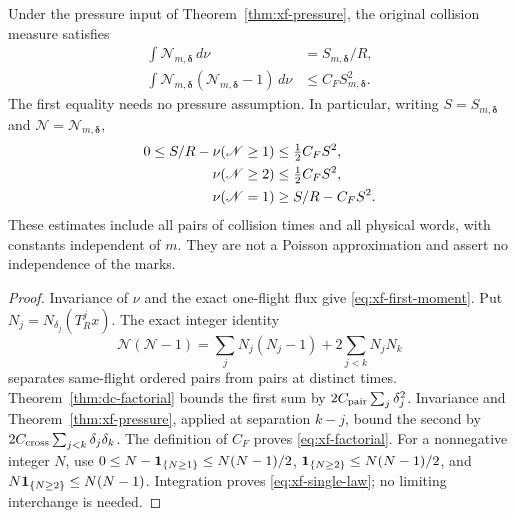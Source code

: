 \begin{theorem}
\label{thm:xf-full-count}
Under the pressure input of Theorem~\ref{thm:xf-pressure}, the
original collision measure satisfies
\begin{align}
 \int\mathscr N_{m,\boldsymbol\delta}\,d\nu
           &=S_{m,\boldsymbol\delta}/R,\label{eq:xf-first-moment}\\
 \int\mathscr N_{m,\boldsymbol\delta}
       (\mathscr N_{m,\boldsymbol\delta}-1)\,d\nu
           &\le C_F S_{m,\boldsymbol\delta}^2.\label{eq:xf-factorial}
\end{align}
The first equality needs no pressure assumption. In particular,
writing $S=S_{m,\boldsymbol\delta}$ and $\mathscr N=\mathscr N_{m,\boldsymbol\delta}$,
\begin{align}
 0\le S/R-\nu(\mathscr N\ge1)&\le\tfrac12C_FS^2,\notag\\
 \nu(\mathscr N\ge2)&\le\tfrac12C_FS^2,\notag\\
 \nu(\mathscr N=1)&\ge S/R-C_FS^2.\label{eq:xf-single-law}
\end{align}
These estimates include all pairs of collision times and all physical
words, with constants independent of $m$. They are not a Poisson
approximation and assert no independence of the marks.
\end{theorem}
\begin{proof}
Invariance of $\nu$ and the exact one-flight flux give
\eqref{eq:xf-first-moment}. Put $N_j=N_{\delta_j}(T_R^jx)$.
The exact integer identity
\[
 \mathscr N(\mathscr N-1)
      =\sum_jN_j(N_j-1)+2\sum_{j<k}N_jN_k
\]
separates same-flight ordered pairs from pairs at distinct times.
Theorem~\ref{thm:dc-factorial} bounds the first sum by
$2C_{\rm pair}\sum_j\delta_j^2$. Invariance and
Theorem~\ref{thm:xf-pressure}, applied at separation $k-j$, bound
the second by $2C_{\rm cross}\sum_{j<k}\delta_j\delta_k$.
The definition of $C_F$ proves \eqref{eq:xf-factorial}.
For a nonnegative integer $N$, use
$0\le N-\mathbf1_{\{N\ge1\}}\le N(N-1)/2$,
$\mathbf1_{\{N\ge2\}}\le N(N-1)/2$, and
$N\mathbf1_{\{N\ge2\}}\le N(N-1)$. Integration proves
\eqref{eq:xf-single-law}; no limiting interchange is needed.
\end{proof}


